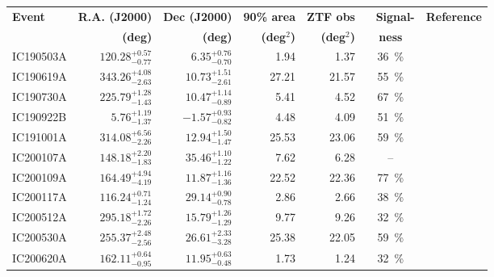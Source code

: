 \appendix

\def\arraystretch{1.5}
\begin{table*}
\centering
\small
    \begin{tabular}{l r r r r c c} 
        \textbf{Event} & \textbf{R.A. (J2000)} & \textbf{Dec (J2000)} & \textbf{90\% area} & \textbf{ZTF obs} &~ \textbf{Signal-}& \textbf{Reference}\\
        & \textbf{(deg)}&\textbf{(deg)}& \textbf{(deg$^{2}$)}& \textbf{(deg$^{2}$)} & \textbf{ness} &\\
        \hline
        IC190503A & $120.28^{+0.57}_{-0.77}$ & $6.35^{+0.76}_{-0.70}$ & 1.94 & 1.37 & \SI{36}{\percent}&\cite{IC190503A1, IC190503A2}\\
        IC190619A & $343.26^{+4.08}_{-2.63}$ & $10.73^{+1.51}_{-2.61}$ & 27.21 & 21.57 & \SI{55}{\percent}&\cite{IC190619A1, IC190619A2}\\
        IC190730A & $225.79^{+1.28}_{-1.43}$ & $10.47^{+1.14}_{-0.89}$ & 5.41 & 4.52 & \SI{67}{\percent}&\cite{IC190730A1, IC190730A2}\\
        IC190922B & $5.76^{+1.19}_{-1.37}$ & $-1.57^{+0.93}_{-0.82}$ & 4.48 & 4.09 & \SI{51}{\percent}&\cite{IC190922B1, IC190922B2, IC190922B3}\\
        IC191001A & $314.08^{+6.56}_{-2.26}$ & $12.94^{+1.50}_{-1.47}$ & 25.53 & 23.06 & \SI{59}{\percent}& \cite{IC191001A1, IC191001A2, IC191001A3}\\
        IC200107A & $148.18^{+2.20}_{-1.83}$ & $35.46^{+1.10}_{-1.22}$ & 7.62 & 6.28 & -- &\cite{IC200107A1, IC200107A2}\\
        IC200109A & $164.49^{+4.94}_{-4.19}$ & $11.87^{+1.16}_{-1.36}$ & 22.52 & 22.36 & \SI{77}{\percent}&\cite{IC200109A1, IC200109A2}\\
        IC200117A & $116.24^{+0.71}_{-1.24}$ & $29.14^{+0.90}_{-0.78}$ & 2.86 &  2.66 & \SI{38}{\percent}&\cite{IC200117A1, IC200117A2, IC200117A3}\\
        IC200512A & $295.18^{+1.72}_{-2.26}$ & $15.79^{+1.26}_{-1.29}$ & 9.77 &  9.26 & \SI{32}{\percent}&\cite{IC200512A1, IC200512A2}\\
        IC200530A & $255.37^{+2.48}_{-2.56}$ & $26.61^{+2.33}_{-3.28}$ & 25.38 & 22.05 & \SI{59}{\percent}&\cite{IC200530A1, IC200530A2, IC200530A3, IC200530A4}\\
        IC200620A & $162.11^{+0.64}_{-0.95}$ & $11.95^{+0.63}_{-0.48}$ & 1.73 & 1.24 & \SI{32}{\percent}&\cite{IC200620A1, IC200620A2}\\

\end{tabular}
\end{table*}
